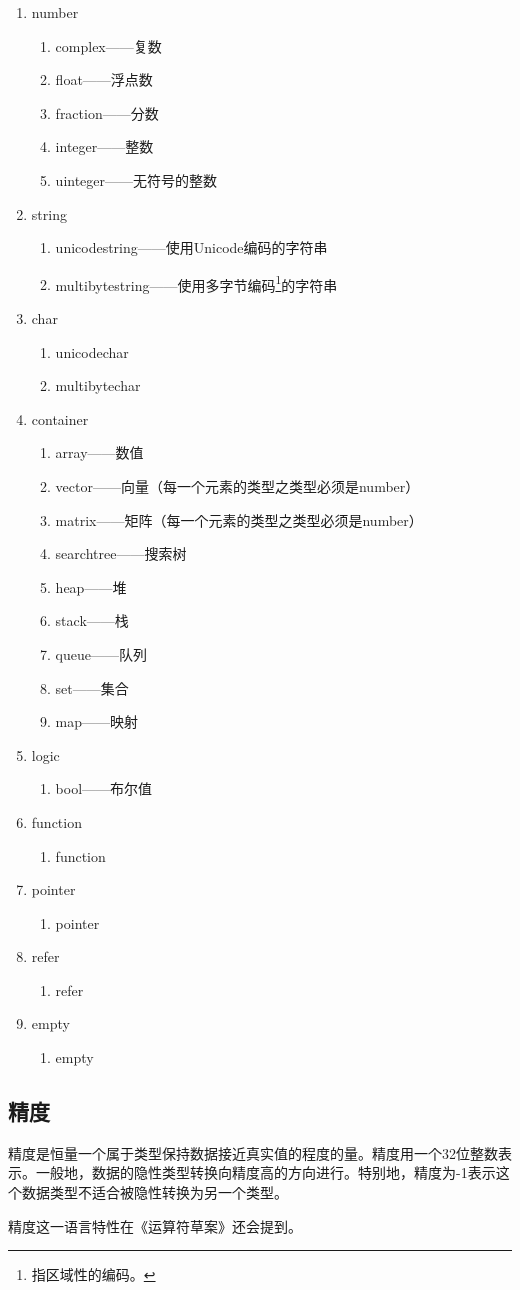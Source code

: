\documentclass[11pt]{ctexrep}
\begin{document}
\begin{enumerate}
\item number
	\begin{enumerate}
	\item complex——复数
	\item float——浮点数
	\item fraction——分数
	\item integer——整数
	\item uinteger——无符号的整数
	\end{enumerate}
\item string
	\begin{enumerate}
	\item unicodestring——使用Unicode编码的字符串
	\item multibytestring——使用多字节编码\footnote{指区域性的编码。}的字符串
	\end{enumerate}
\item char
	\begin{enumerate}
	\item unicodechar
	\item multibytechar
	\end{enumerate}
\item container
	\begin{enumerate}
	\item array——数值
	\item vector——向量（每一个元素的类型之类型必须是number）
	\item matrix——矩阵（每一个元素的类型之类型必须是number）
	\item searchtree——搜索树
	\item heap——堆
	\item stack——栈
	\item queue——队列
	\item set——集合
	\item map——映射
	\end{enumerate}
\item logic
	\begin{enumerate}
	\item bool——布尔值
	\end{enumerate}
\item function
	\begin{enumerate}
	\item function
	\end{enumerate}
\item pointer
	\begin{enumerate}
	\item pointer
	\end{enumerate}
\item refer
	\begin{enumerate}
	\item refer
	\end{enumerate}
\item empty
	\begin{enumerate}
	\item empty
	\end{enumerate}
\end{enumerate}

\subsection{精度}

精度是恒量一个属于类型保持数据接近真实值的程度的量。精度用一个32位整数表示。一般地，数据的隐性类型转换向精度高的方向进行。特别地，精度为-1表示这个数据类型不适合被隐性转换为另一个类型。

精度这一语言特性在《运算符草案》还会提到。
\end{document}
